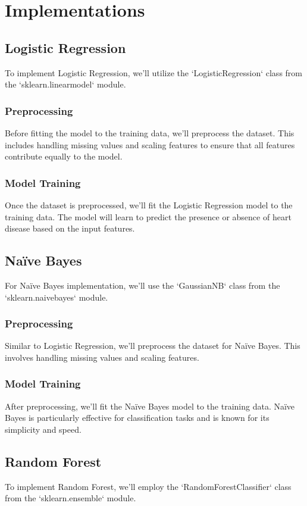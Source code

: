 \section{Implementations}

\subsection{Logistic Regression}
To implement Logistic Regression,  we'll utilize the `LogisticRegression` class from the `sklearn.linearmodel` module. 

\subsubsection{Preprocessing}
Before fitting the model to the training data, we'll preprocess the dataset. This includes handling missing values and scaling features to ensure that all features contribute equally to the model.

\subsubsection{Model Training}
Once the dataset is preprocessed, we'll fit the Logistic Regression model to the training data. The model will learn to predict the presence or absence of heart disease based on the input features.

\subsection{Naïve Bayes}
For Naïve Bayes implementation, we'll use the `GaussianNB` class from the `sklearn.naivebayes` module.

\subsubsection{Preprocessing}
Similar to Logistic Regression, we'll preprocess the dataset for Naïve Bayes. This involves handling missing values and scaling features.

\subsubsection{Model Training}
After preprocessing, we'll fit the Naïve Bayes model to the training data. Naïve Bayes is particularly effective for classification tasks and is known for its simplicity and speed.

\subsection{Random Forest}
To implement Random Forest, we'll employ the `RandomForestClassifier` class from the `sklearn.ensemble` module.

